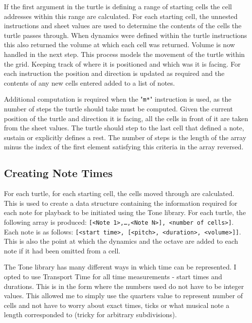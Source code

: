 If the first argument in the turtle is defining a range of starting cells the cell addresses within this range are calculated. For each starting cell, the unnested instructions and sheet values are used to determine the contents of the cells the turtle passes through. When dynamics were defined within the turtle instructions this also returned the volume at which each cell was returned. Volume is now handled in the next step. This process models the movement of the turtle within the grid. Keeping track of where it is positioned and which was it is facing. For each instruction the position and direction is updated as required and the contents of any new cells entered added to a list of notes.

Additional computation is required when the "\texttt{m*}" instruction is used, as the number of steps the turtle should take must be computed. Given the current position of the turtle and direction it is facing, all the cells  in front of it are taken from the sheet values. The turtle should step to the last cell that defined a note, sustain or explicitly defines a rest. The number of steps is the length of the array minus the index of the first element satisfying this criteria in the array reversed.

\subsection{Creating Note Times}

For each turtle, for each starting cell, the cells moved through are calculated. This is used to create a data structure containing the information required for each note for playback to be initiated using the Tone library. For each turtle, the following array is produced: \texttt{[<Note 1>,…,<Note N>], <number of cells>]}. Each note is as follows: \texttt{[<start time>, [<pitch>, <duration>, <volume>]]}. This is also the point at which the dynamics and the octave are added to each note if it had been omitted from a cell.

The Tone library has many different ways in which time can be represented. I opted to use Transport Time for all time measurements - start times and durations. This is in the form \texttt{} where the numbers used do not have to be integer values. This allowed me to simply use the quarters value to represent number of cells and not have to worry about exact times, ticks or what musical note a length corresponded to (tricky for arbitrary subdivisions).

